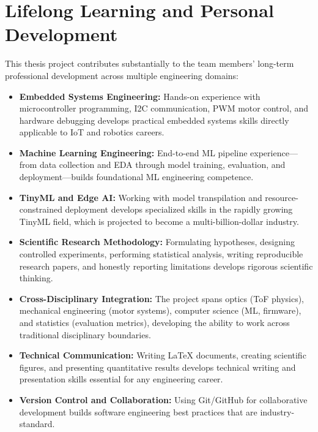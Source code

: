 \documentclass[12pt,a4paper]{article}
\begin{document}

    \section{Lifelong Learning and Personal Development}

    This thesis project contributes substantially to the team members' long-term professional development across multiple engineering domains:

    \begin{itemize}[leftmargin=0.35in]
        \item \textbf{Embedded Systems Engineering:} Hands-on experience with microcontroller programming, I2C communication, PWM motor control, and hardware debugging develops practical embedded systems skills directly applicable to IoT and robotics careers.

        \item \textbf{Machine Learning Engineering:} End-to-end ML pipeline experience---from data collection and EDA through model training, evaluation, and deployment---builds foundational ML engineering competence.

        \item \textbf{TinyML and Edge AI:} Working with model transpilation and resource-constrained deployment develops specialized skills in the rapidly growing TinyML field, which is projected to become a multi-billion-dollar industry.

        \item \textbf{Scientific Research Methodology:} Formulating hypotheses, designing controlled experiments, performing statistical analysis, writing reproducible research papers, and honestly reporting limitations develops rigorous scientific thinking.

        \item \textbf{Cross-Disciplinary Integration:} The project spans optics (ToF physics), mechanical engineering (motor systems), computer science (ML, firmware), and statistics (evaluation metrics), developing the ability to work across traditional disciplinary boundaries.

        \item \textbf{Technical Communication:} Writing LaTeX documents, creating scientific figures, and presenting quantitative results develops technical writing and presentation skills essential for any engineering career.

        \item \textbf{Version Control and Collaboration:} Using Git/GitHub for collaborative development builds software engineering best practices that are industry-standard.
    \end{itemize}


    
\end{document}
